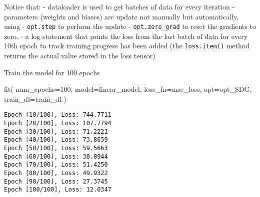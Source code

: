 \documentclass[
  letterpaper,
  DIV=11,
  numbers=noendperiod]{scrartcl}
\newenvironment{Shaded}{\begin{snugshade}}{\end{snugshade}}
\newcommand{\DecValTok}[1]{\textcolor[rgb]{0.68,0.00,0.00}{#1}}
\newcommand{\NormalTok}[1]{\textcolor[rgb]{0.00,0.23,0.31}{#1}}
\newcommand{\OperatorTok}[1]{\textcolor[rgb]{0.37,0.37,0.37}{#1}}
\begin{document}
Notice that: - dataloader is used to get batches of data for every
iteration - parameters (weights and biases) are update not manually but
automatically, using - \texttt{opt.step} to perform the update -
\texttt{opt.zero\_grad} to reset the gradients to zero. - a log
statement that prints the loss from the last batch of data for every
10th epoch to track training progress has been added (the
\texttt{loss.item()} method returns the actual value stored in the loss
tensor)

Train the model for 100 epochs

\begin{Shaded}
\begin{Highlighting}[]
\NormalTok{fit(}
\NormalTok{    num\_epochs}\OperatorTok{=}\DecValTok{100}\NormalTok{,}
\NormalTok{    model}\OperatorTok{=}\NormalTok{linear\_model,}
\NormalTok{    loss\_fn}\OperatorTok{=}\NormalTok{mse\_loss,}
\NormalTok{    opt}\OperatorTok{=}\NormalTok{opt\_SDG,}
\NormalTok{    train\_dl}\OperatorTok{=}\NormalTok{train\_dl}
\NormalTok{)}
\end{Highlighting}
\end{Shaded}

\begin{verbatim}
Epoch [10/100], Loss: 744.7711
Epoch [20/100], Loss: 107.7794
Epoch [30/100], Loss: 71.2221
Epoch [40/100], Loss: 73.8659
Epoch [50/100], Loss: 59.5663
Epoch [60/100], Loss: 30.8944
Epoch [70/100], Loss: 51.4250
Epoch [80/100], Loss: 49.9322
Epoch [90/100], Loss: 27.3745
Epoch [100/100], Loss: 12.0347
\end{verbatim}
\end{document}
